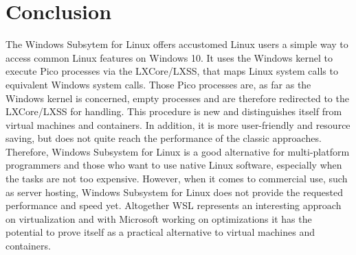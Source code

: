 \documentclass[utf8,biblatex, ngerman, english]{lni}
\begin{document}
\section{Conclusion} 
The Windows Subsytem for Linux offers accustomed Linux users a simple way to access common Linux features on Windows 10.
It uses the Windows kernel to execute Pico processes via the LXCore/LXSS, that maps Linux system calls to equivalent Windows system calls. Those Pico processes are, as far as the Windows kernel is concerned, empty processes and are therefore redirected to the LXCore/LXSS for handling. This procedure is new and distinguishes itself from virtual machines and containers. In addition, it is more user-friendly and resource saving, but does not quite reach the performance of the classic approaches. Therefore, Windows Subsystem for Linux is a good alternative for multi-platform programmers and those who want to use native Linux software, especially when the tasks are not too expensive. However, when it comes to commercial use, such as server hosting, Windows Subsystem for Linux does not provide the requested performance and speed yet. Altogether WSL represents an interesting approach on virtualization and with Microsoft working on optimizations it has the potential to prove 
itself as a practical alternative to virtual machines and containers. 

\printbibliography
\end{document}
